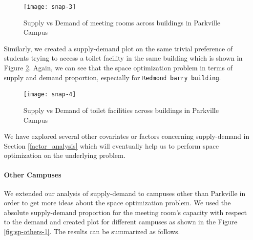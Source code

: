 \begin{figure}[H]
\centering
\texttt{[image: snap-3]}
\caption{Supply vs Demand of meeting rooms across buildings in Parkville Campus}
\label{fig:expo-image-3}
\end{figure}

 Similarly, we created a supply-demand plot on the same trivial preference of students trying to access a toilet facility in the same building which is shown in Figure \ref{fig:expo-image-4}. Again, we can see that the space optimization problem in terms of supply and demand proportion, especially for \texttt{Redmond barry building}.
 
\begin{figure}[H]
\centering
\texttt{[image: snap-4]}
\caption{Supply vs Demand of toilet facilities across buildings in Parkville Campus}
\label{fig:expo-image-4}
\end{figure}

We have explored several other covariates or factors concerning supply-demand in Section \ref{factor_analysis} which will eventually help us to perform space optimization on the underlying problem.

\paragraph{Other Campuses}

We extended our analysis of supply-demand to campuses other than Parkville in order to get more ideas about the space optimization problem. We used the absolute supply-demand proportion for the meeting room's capacity with respect to the demand and created plot for different campuses as shown in the Figure \ref{fig:sp-others-1}. The results can be summarized as follows.

